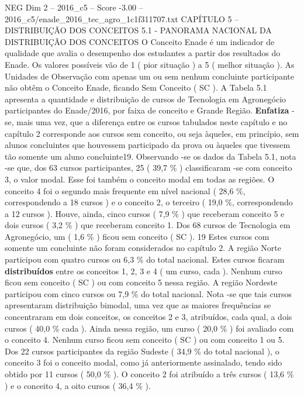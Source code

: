 \begin{textsample}{NEG Dim 2 – 2016\_c5 – Score -3.00 – 2016\_c5/enade\_2016\_tec\_agro\_1c1f311707.txt}  \label{ex:f2_neg_034}
CAPÍTULO 5 – DISTRIBUIÇÃO DOS CONCEITOS 5.1 - PANORAMA NACIONAL DA DISTRIBUIÇÃO DOS CONCEITOS O Conceito Enade é um indicador de qualidade que avalia o desempenho dos estudantes a partir dos resultados do Enade.
Os valores possíveis vão de 1 ( pior situação ) a 5 ( melhor situação ).
As Unidades de Observação com apenas um ou sem nenhum concluinte participante não obtêm o Conceito Enade, ficando Sem Conceito ( SC ).
A Tabela 5.1 apresenta a quantidade e distribuição de cursos de Tecnologia em Agronegócio participantes do Enade/2016, por faixa de conceito e Grande Região. \textbf{Enfatiza} -se, mais uma vez, que a diferença entre os cursos tabulados neste capítulo e no capítulo 2 corresponde aos cursos sem conceito, ou seja àqueles, em princípio, sem alunos concluintes que houvessem participado da prova ou àqueles que tivessem tão somente um aluno concluinte19.
Observando -se os dados da Tabela 5.1, nota -se que, dos 63 cursos participantes, 25 ( 39,7 \% ) classificaram -se com conceito 3, o valor modal.
Esse foi também o conceito modal em todas as regiões.
O conceito 4 foi o segundo mais frequente em nível nacional ( 28,6 \%, correspondendo a 18 cursos ) e o conceito 2, o terceiro ( 19,0 \%, correspondendo a 12 cursos ).
Houve, ainda, cinco cursos ( 7,9 \% ) que receberam conceito 5 e dois cursos ( 3,2 \% ) que receberam conceito 1.
Dos 68 cursos de Tecnologia em Agronegócio, um ( 1,6 \% ) ficou sem conceito ( SC ). 19 Estes cursos com somente um concluinte não foram considerados no capítulo 2.
A região Norte participou com quatro cursos ou 6,3 \% do total nacional.
Estes cursos ficaram \textbf{distribuídos} entre os conceitos 1, 2, 3 e 4 ( um curso, cada ).
Nenhum curso ficou sem conceito ( SC ) ou com conceito 5 nessa região.
A região Nordeste participou com cinco cursos ou 7,9 \% do total nacional.
Nota -se que tais cursos apresentaram distribuição bimodal, uma vez que as maiores frequências se concentraram em dois conceitos, os conceitos 2 e 3, atribuídos, cada qual, a dois cursos ( 40,0 \% cada ).
Ainda nessa região, um curso ( 20,0 \% ) foi avaliado com o conceito 4.
Nenhum curso ficou sem conceito ( SC ) ou com conceito 1 ou 5.
Dos 22 cursos participantes da região Sudeste ( 34,9 \% do total nacional ), o conceito 3 foi o conceito modal, como já anteriormente assinalado, tendo sido obtido por 11 cursos ( 50,0 \% ).
O conceito 2 foi atribuído a três cursos ( 13,6 \% ) e o conceito 4, a oito cursos ( 36,4 \% ).

\end{textsample}
